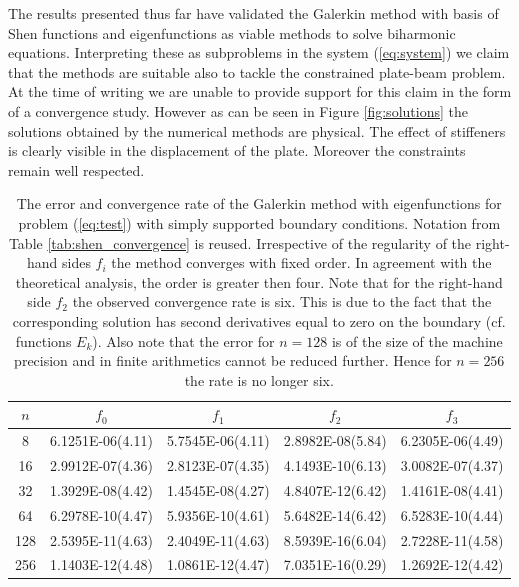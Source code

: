 \documentclass{marine_2015}
\begin{document}
  The results presented thus far have validated the Galerkin method with basis
  of Shen functions and eigenfunctions as viable methods to solve biharmonic
  equations. Interpreting these as subproblems in the system (\ref{eq:system}) we
  claim that the methods are suitable also to tackle the constrained plate-beam
  problem. At the time of writing we are unable to provide support for this claim in
  the form of a convergence study. However as can be seen in Figure \ref{fig:solutions} 
  the solutions obtained by the numerical methods are physical. The effect of
  stiffeners is clearly visible in the displacement of the plate. Moreover the 
  constraints remain well respected.
\begin{table}[t!]
    \begin{center}
    \begin{tabular}{ccccc}
\hline
$n$  &  $f_0$  & $f_1$ & $f_2$ & $f_3$\\
\hline
8    & 6.1251E-06(4.11) & 5.7545E-06(4.11) & 2.8982E-08(5.84)& 6.2305E-06(4.49) \\
16   & 2.9912E-07(4.36) & 2.8123E-07(4.35) & 4.1493E-10(6.13)& 3.0082E-07(4.37) \\
32   & 1.3929E-08(4.42) & 1.4545E-08(4.27) & 4.8407E-12(6.42)& 1.4161E-08(4.41) \\
64   & 6.2978E-10(4.47) & 5.9356E-10(4.61) & 5.6482E-14(6.42)& 6.5283E-10(4.44) \\
128  & 2.5395E-11(4.63) & 2.4049E-11(4.63) & 8.5939E-16(6.04)& 2.7228E-11(4.58) \\
256  & 1.1403E-12(4.48) & 1.0861E-12(4.47) & 7.0351E-16(0.29)& 1.2692E-12(4.42) \\
\hline
    \end{tabular}
    \caption{The error and convergence rate of the Galerkin method with eigenfunctions for
    problem (\ref{eq:test}) with simply supported boundary conditions. Notation
    from Table \ref{tab:shen_convergence} is reused. Irrespective of the regularity of 
    the right-hand sides $f_i$ the method converges with fixed order. In agreement 
    with the theoretical analysis, the order is greater then four. Note that for 
    the right-hand side $f_2$ the observed convergence rate is six. This is due 
    to the fact that the corresponding solution has second derivatives equal to 
    zero on the boundary (cf. functions $E_k$). Also note that the error for 
    $n=128$ is of the size of the machine precision and in finite arithmetics 
    cannot be reduced further. Hence for $n=256$ the rate is no longer six.}
  \label{tab:sine_convergence}
  \end{center}
  \end{table}
\end{document}
